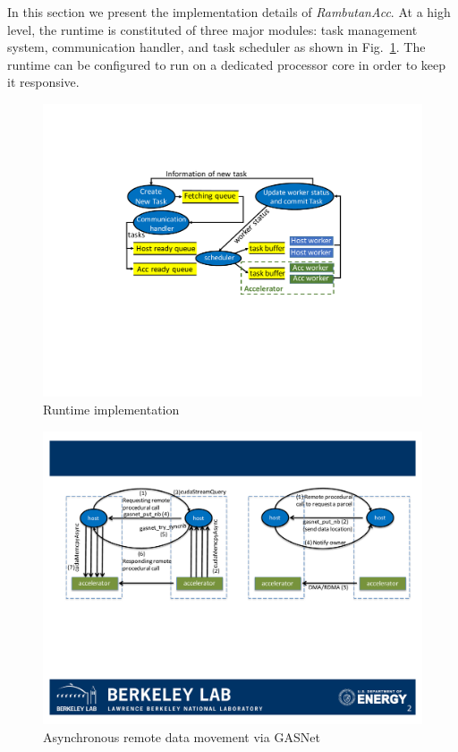 In this section we present the implementation details of {\em RambutanAcc}.
At a high level, the runtime is constituted of three major modules: task management system, communication handler, and task scheduler as shown in Fig.~\ref{fig:impl}. 
The runtime can be configured to run on a dedicated processor core in order to keep it responsive.

\begin{figure}[htb]
\centering
\includegraphics[width=.49\textwidth]{figures/impl.pdf}
\caption{Runtime implementation}
\label{fig:impl}
\end{figure}

\begin{figure}[htb]
\centering
\includegraphics[width=.49\textwidth]{figures/handler.pdf}
\caption{Asynchronous remote data movement via GASNet}
\label{fig:handler}
\end{figure}

